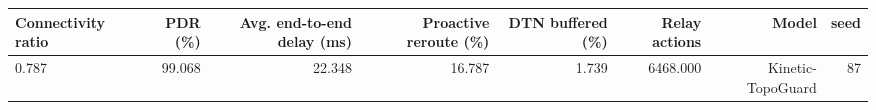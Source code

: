 \begin{tabular}{lrrrrrrr}
\toprule
Connectivity ratio & PDR (\%) & Avg. end-to-end delay (ms) & Proactive reroute (\%) & DTN buffered (\%) & Relay actions & Model & seed \\
\midrule
0.787 & 99.068 & 22.348 & 16.787 & 1.739 & 6468.000 & Kinetic-TopoGuard & 87 \\
\bottomrule
\end{tabular}